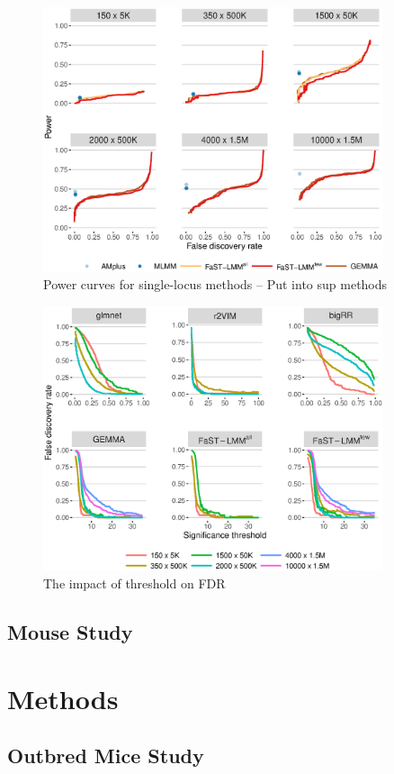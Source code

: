 \documentclass{nature}
\begin{document}
\begin{figure}
\label{fig_power_single}
\caption{Power curves for single-locus methods -- Put into sup methods}
\includegraphics[width=10cm]{powerSingle}
\end{figure}


\begin{figure}
\label{fig_threshold}
\caption{The impact of threshold on FDR }
\includegraphics[width=10cm]{threshold}
\end{figure}




\subsection{Mouse Study}

\section{Methods}

\subsection{Outbred Mice Study}
\end{document}
